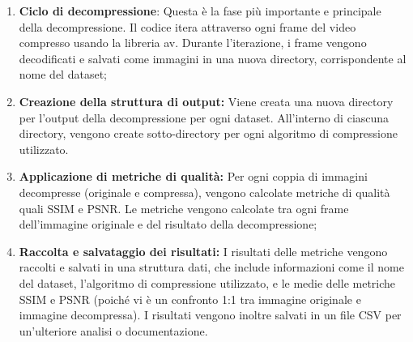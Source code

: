 \begin{enumerate}
    \item \textbf{Ciclo di decompressione}: Questa è la fase più importante e principale della decompressione. Il codice itera attraverso ogni frame del video compresso usando la libreria av. Durante l'iterazione, i frame vengono decodificati e salvati come immagini in una nuova directory, corrispondente al nome del dataset;
    \item \textbf{Creazione della struttura di output:} Viene creata una nuova directory per l'output della decompressione per ogni dataset. All'interno di ciascuna directory, vengono create sotto-directory per ogni algoritmo di compressione utilizzato.
    \item \textbf{Applicazione di metriche di qualità:} Per ogni coppia di immagini decompresse (originale e compressa), vengono calcolate metriche di qualità quali SSIM e PSNR. Le metriche vengono calcolate tra ogni frame dell'immagine originale e del risultato della decompressione;
    \item \textbf{Raccolta e salvataggio dei risultati:} I risultati delle metriche vengono raccolti e salvati in una struttura dati, che include informazioni come il nome del dataset, l'algoritmo di compressione utilizzato, e le medie delle metriche SSIM e PSNR (poiché vi è un confronto 1:1 tra immagine originale e immagine decompressa). I risultati vengono inoltre salvati in un file CSV per un'ulteriore analisi o documentazione.

\end{enumerate}












